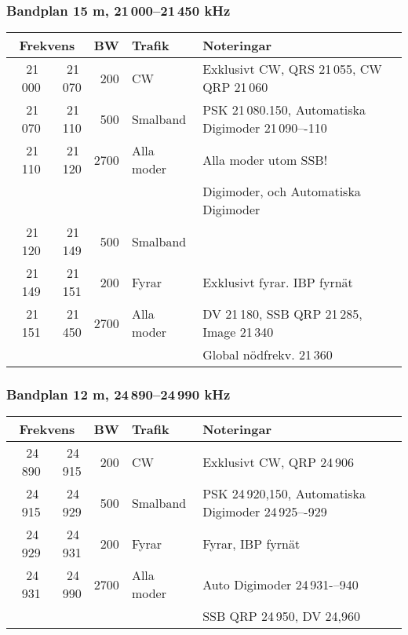 \subsubsection{Bandplan 15 m, 21\,000--21\,450 kHz}
\begin{tabular}{rrrll}
\multicolumn{2}{c}{\textbf{Frekvens}} & \textbf{BW} & \textbf{Trafik} & \textbf{Noteringar} \\ \hline

21\,000 & 21\,070 & 200  & CW         & Exklusivt CW, QRS 21\,055, CW QRP 21\,060           \\ \hline
21\,070 & 21\,110 & 500  & Smalband   & PSK 21\,080.150, Automatiska Digimoder 21\,090–-110 \\
21\,110 & 21\,120 & 2700 & Alla moder & Alla moder utom SSB!                                \\
        &         &      &            & Digimoder, och Automatiska Digimoder                \\ \hline
21\,120 & 21\,149 & 500  & Smalband   &                                                     \\ \hline
21\,149 & 21\,151 & 200  & Fyrar      & Exklusivt fyrar. IBP fyrnät                         \\ \hline
21\,151 & 21\,450 & 2700 & Alla moder & DV 21\,180, SSB QRP 21\,285, Image 21\,340          \\
        &         &      &            & Global nödfrekv. 21\,360                            \\ \hline
\end{tabular}

\subsubsection{Bandplan 12 m, 24\,890--24\,990 kHz}
\begin{tabular}{rrrll}
\multicolumn{2}{c}{\textbf{Frekvens}} & \textbf{BW} & \textbf{Trafik} & \textbf{Noteringar} \\ \hline
24\,890 & 24\,915 & 200  & CW         & Exklusivt CW, QRP 24\,906                             \\ \hline
24\,915 & 24\,929 & 500  & Smalband   & PSK 24\,920,150, Automatiska Digimoder 24\,925–-929 \\ \hline
24\,929 & 24\,931 & 200  & Fyrar      & Fyrar, IBP fyrnät                                    \\ \hline
24\,931 & 24\,990 & 2700 & Alla moder & Auto Digimoder 24\,931-–940                        \\
       &        &      &            & SSB QRP 24\,950, DV 24,960                            \\ \hline
\end{tabular}

